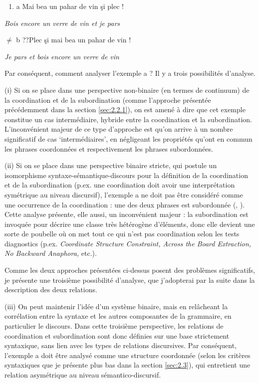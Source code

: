 \begin{enumerate}
\item \label{bkm:Ref272684772}a  Mai bea un pahar de vin şi plec !


\end{enumerate}
{\itshape
Bois encore un verre de vin et je pars}

${\neq}$  b  ??Plec şi mai bea un pahar de vin !

    \textit{Je pars et bois encore un verre de vin}

Par conséquent, comment analyser l'exemple a ? Il y a trois possibilités d'analyse. 

(i) Si on se place dans une perspective non-binaire (en termes de continuum) de la coordination et de la subordination (comme l'approche présentée précédemment dans la section \ref{sec:2.2.1}), on est amené à dire que cet exemple constitue un cas intermédiaire, hybride entre la coordination et la subordination. L'inconvénient majeur de ce type d'approche est qu'on arrive à un nombre significatif de cas `intermédiaires', en négligeant les propriétés qu'ont en commun les phrases coordonnées et respectivement les phrases subordonnées. 

(ii) Si on se place dans une perspective binaire stricte, qui postule un isomorphisme syntaxe-sémantique-discours pour la définition de la coordination et de la subordination (p.ex. une coordination doit avoir une interprétation symétrique au niveau discursif), l'exemple a ne doit pas être considéré comme une occurrence de la coordination : une des deux phrases est subordonnée (\citet{Goldsmith1985}, \citet{Postal1993}). Cette analyse présente, elle aussi, un inconvénient majeur : la subordination est invoquée pour décrire une classe très hétérogène d'éléments, donc elle devient une sorte de poubelle où on met tout ce qui n'est pas coordination selon les tests diagnostics (p.ex. \textit{Coordinate Structure Constraint, Across the Board Extraction, No Backward Anaphora,} etc.).

Comme les deux approches présentées ci-dessus posent des problèmes significatifs, je présente une troisième possibilité d'analyse, que j'adopterai par la suite dans la description des deux relations. 

(iii) On peut maintenir l'idée d'un système binaire, mais en relâcheant la corrélation entre la syntaxe et les autres composantes de la grammaire, en particulier le discours. Dans cette troisième perspective, les relations de coordination et subordination sont donc définies sur une base strictement syntaxique, sans lien avec les types de relations discursives. Par conséquent, l'exemple a doit être analysé comme une structure coordonnée (selon les critères syntaxiques que je présente plus bas dans la section \ref{sec:2.3}), qui entretient une relation asymétrique au niveau sémantico-discursif.

